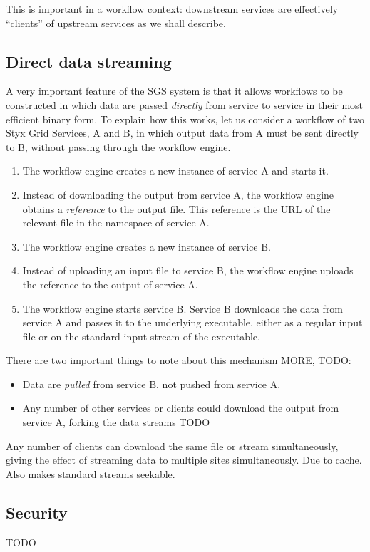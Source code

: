 \documentclass[a4paper]{article}
\begin{document}
This is important in a workflow context: downstream services are effectively ``clients'' of upstream services as we shall describe.

\subsection{Direct data streaming}\label{sec:datapassing}
A very important feature of the SGS system is that it allows workflows to be constructed in which data are passed \textit{directly} from service to service in their most efficient binary form.  To explain how this works, let us consider a workflow of two Styx Grid Services, A and B, in which output data from A must be sent directly to B, without passing through the workflow engine.

\begin{enumerate}
\item The workflow engine creates a new instance of service A and starts it.
\item Instead of downloading the output from service A, the workflow engine obtains a \textit{reference} to the output file.  This reference is the URL of the relevant file in the namespace of service A.
\item The workflow engine creates a new instance of service B.
\item Instead of uploading an input file to service B, the workflow engine uploads the reference to the output of service A.
\item The workflow engine starts service B.  Service B downloads the data from service A and passes it to the underlying executable, either as a regular input file or on the standard input stream of the executable.
\end{enumerate}

There are two important things to note about this mechanism MORE, TODO:
\begin{itemize}
\item Data are \textit{pulled} from service B, not pushed from service A.
\item Any number of other services or clients could download the output from service A, forking the data streams TODO
\end{itemize}

Any number of clients can download the same file or stream simultaneously, giving the effect of streaming data to multiple sites simultaneously.  Due to cache.  Also makes standard streams seekable.

\subsection{Security}
TODO
\end{document}
